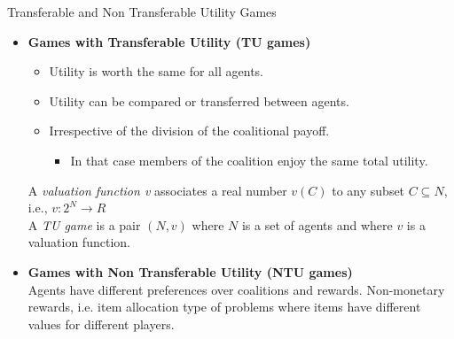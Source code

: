 \documentclass{beamer}
\begin{document}
\begin{frame}{Transferable and Non Transferable Utility Games}
    \begin{itemize}
        \item \textbf{Games with Transferable Utility (TU games)}
        \begin{itemize}
            \item Utility is worth the same for all agents.
            \item Utility can be {\color{red} compared} or {\color{red} transferred} between agents.
            \item Irrespective of the division of the coalitional payoff.
            \begin{itemize}
                \item In that case members of the coalition enjoy the same total utility.
            \end{itemize}
        \end{itemize}


        \begin{definition} \label{dfn:valuationfunction}
            A \emph{valuation function v} associates a real number $v(C)$ to any subset $C \subseteq N$, i.e., $v:2^N \rightarrow R$ \\
            A {\color{blue}\emph{TU game}} is a pair $(N,v)$ where $N$ is a set of agents and where $v$ is a valuation function.
        \end{definition}



        \item \textbf{Games with Non Transferable Utility (NTU games)} \\
            Agents have different preferences over coalitions and rewards. Non-monetary rewards, i.e. item allocation type of problems where items have different values for different players.
    \end{itemize}
\end{frame}
\end{document}
